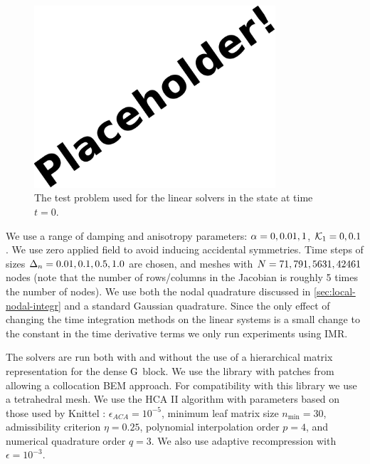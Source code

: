 \begin{figure}
  \centering
  \includegraphics[width=0.8\textwidth]{images/placeholder}
  \caption{The test problem used for the linear solvers in the state at time $t=0$.}
  \label{fig:cube-initial-condition}
\end{figure}


We use a range of damping and anisotropy parameters: $\alpha = 0, 0.01, 1$, $\mathcal{K}_1 = 0, 0.1$.
We use zero applied field to avoid inducing accidental symmetries.
Time steps of sizes $\Delta_{n} = 0.01, 0.1, 0.5, 1.0$ are chosen, and meshes with $N= 71, 791, 5631, 42461$ nodes (note that the number of rows/columns in the Jacobian is roughly 5 times the number of nodes).
We use both the nodal quadrature discussed in \cref{sec:local-nodal-integr} and a standard Gaussian quadrature.
Since the only effect of changing the time integration methods on the linear systems is a small change to the constant in the time derivative terms we only run experiments using IMR.

The solvers are run both with and without the use of a hierarchical matrix representation for the dense $\mathrm{G}$ block.
We use the \hlib library \cite{hlib-website} with patches from \nmag \cite{nmag-website} allowing a collocation BEM approach.
For compatibility with this library we use a tetrahedral mesh.
We use the HCA II algorithm with parameters based on those used by Knittel \cite{Knittel2011}:
$\epsilon_{ACA} = 10^{-5}$,
minimum leaf matrix size $n_{\text{min}}= 30$,
admissibility criterion $\eta = 0.25$,
polynomial interpolation order $p=4$, and
numerical quadrature order $q=3$.
We also use adaptive recompression with $\epsilon = 10^{-3}$.

